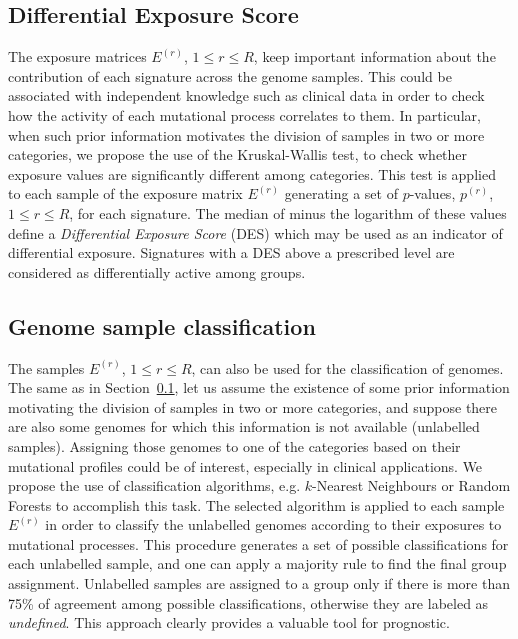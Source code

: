 \documentclass{bioinfo}
\begin{document}
\subsection{Differential Exposure Score}\label{sec:DES}
The exposure matrices $E^{(r)}$, $1 \leq r \leq R$, keep important
information about the contribution of each signature across the genome
samples. This could be associated with independent knowledge such as
clinical data in order to check how the activity of each mutational
process correlates to them. In particular, when such prior information
motivates the division of samples in two or more categories, we
propose the use of the Kruskal-Wallis test, to check whether exposure
values are significantly different among categories. This test is
applied to each sample of the exposure matrix $E^{(r)}$ generating a
set of $p$-values, $p^{(r)}$, $1 \leq r \leq R$, for each
signature. The median of minus the logarithm of these values define a
\emph{Differential Exposure Score} (DES) which may be used as an
indicator of differential exposure.  Signatures with a DES above a
prescribed level are considered as differentially active among groups.

\subsection{Genome sample classification}
The samples $E^{(r)}$, $1\leq r\leq R$, can also be used for the
classification of genomes. The same as in Section~\ref{sec:DES}, let
us assume the existence of some prior information motivating the
division of samples in two or more categories, and suppose there are
also some genomes for which this information is not available
(unlabelled samples). Assigning those genomes to one of the categories 
based on their mutational profiles could be of interest, especially
in clinical applications. We propose the use of classification
algorithms, e.g. $k$-Nearest Neighbours or Random Forests to
accomplish this task. The selected algorithm is applied to each 
sample $E^{(r)}$ in order to classify the unlabelled
genomes according to their exposures to mutational processes.
This procedure generates a set of possible classifications
for each unlabelled sample, and one can apply a majority rule to find
the final group assignment.  Unlabelled samples are assigned
to a group only if there is more than 75\% of agreement among possible
classifications, otherwise they are labeled as \textit{undefined}. 
This approach clearly provides a valuable tool for prognostic.
\end{document}
